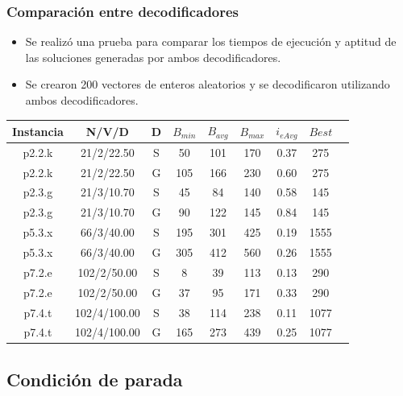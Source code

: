 \documentclass{beamer}
\begin{document}
\begin{frame}
\frametitle{Comparación entre decodificadores}

\begin{itemize}
    \item Se realizó una prueba para comparar los tiempos de ejecución y aptitud de las soluciones generadas por ambos decodificadores.
    \pause
    \item Se crearon 200 vectores de enteros aleatorios y se decodificaron utilizando ambos decodificadores.
    \pause
\end{itemize}

\begin{table}
\begin{center}
\begin{tabular}{ |c|c|c|c|c|c|c|c|c| } 
\hline
Instancia & N/V/D & D & $B_{min}$ & $B_{avg}$ & $B_{max}$ & $i_{eAvg}$ & $Best$ \\
\hline
p2.2.k & 21/2/22.50 & S & 50 & 101 & 170 & 0.37 & 275 \\
p2.2.k & 21/2/22.50 & G & 105 & 166 & 230 & 0.60 & 275 \\
p2.3.g & 21/3/10.70 & S & 45 & 84 & 140 & 0.58 & 145 \\
p2.3.g & 21/3/10.70 & G & 90 & 122 & 145 & 0.84 & 145 \\
p5.3.x & 66/3/40.00 & S & 195 & 301 & 425 & 0.19 & 1555 \\
p5.3.x & 66/3/40.00 & G & 305 & 412 & 560 & 0.26 & 1555 \\
p7.2.e & 102/2/50.00 & S & 8 & 39 & 113 & 0.13 & 290 \\
p7.2.e & 102/2/50.00 & G & 37 & 95 & 171 & 0.33 & 290 \\
p7.4.t & 102/4/100.00 & S & 38 & 114 & 238 & 0.11 & 1077 \\
p7.4.t & 102/4/100.00 & G & 165 & 273 & 439 & 0.25 & 1077 \\
\hline
\end{tabular}
\end{center}
\label{tab:resultadosDecoSimple}
\end{table}


\end{frame}


\subsection{Condición de parada}
\end{document}
